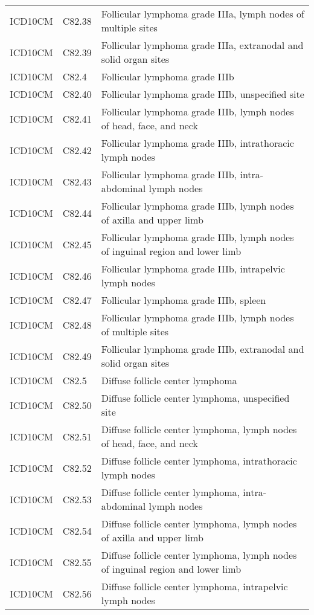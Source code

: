 \begin{longtable}{p{}p{}p{}}
  ICD10CM & C82.38 & Follicular lymphoma grade IIIa, lymph nodes of multiple sites \\ 
  ICD10CM & C82.39 & Follicular lymphoma grade IIIa, extranodal and solid organ sites \\ 
  ICD10CM & C82.4 & Follicular lymphoma grade IIIb \\ 
  ICD10CM & C82.40 & Follicular lymphoma grade IIIb, unspecified site \\ 
  ICD10CM & C82.41 & Follicular lymphoma grade IIIb, lymph nodes of head, face, and neck \\ 
  ICD10CM & C82.42 & Follicular lymphoma grade IIIb, intrathoracic lymph nodes \\ 
  ICD10CM & C82.43 & Follicular lymphoma grade IIIb, intra-abdominal lymph nodes \\ 
  ICD10CM & C82.44 & Follicular lymphoma grade IIIb, lymph nodes of axilla and upper limb \\ 
  ICD10CM & C82.45 & Follicular lymphoma grade IIIb, lymph nodes of inguinal region and lower limb \\ 
  ICD10CM & C82.46 & Follicular lymphoma grade IIIb, intrapelvic lymph nodes \\ 
  ICD10CM & C82.47 & Follicular lymphoma grade IIIb, spleen \\ 
  ICD10CM & C82.48 & Follicular lymphoma grade IIIb, lymph nodes of multiple sites \\ 
  ICD10CM & C82.49 & Follicular lymphoma grade IIIb, extranodal and solid organ sites \\ 
  ICD10CM & C82.5 & Diffuse follicle center lymphoma \\ 
  ICD10CM & C82.50 & Diffuse follicle center lymphoma, unspecified site \\ 
  ICD10CM & C82.51 & Diffuse follicle center lymphoma, lymph nodes of head, face, and neck \\ 
  ICD10CM & C82.52 & Diffuse follicle center lymphoma, intrathoracic lymph nodes \\ 
  ICD10CM & C82.53 & Diffuse follicle center lymphoma, intra-abdominal lymph nodes \\ 
  ICD10CM & C82.54 & Diffuse follicle center lymphoma, lymph nodes of axilla and upper limb \\ 
  ICD10CM & C82.55 & Diffuse follicle center lymphoma, lymph nodes of inguinal region and lower limb \\ 
  ICD10CM & C82.56 & Diffuse follicle center lymphoma, intrapelvic lymph nodes \\ 

\end{longtable}
